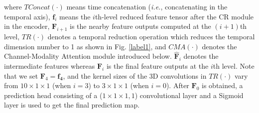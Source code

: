 \documentclass[letterpaper]{article}
\def\ie{\emph{i.e.}}
\begin{document}
\noindent where $TConcat(\cdot)$ means time concatenation (\ie, concatenating in the temporal axis), $\mathbf{f}_{i}$ means the $i$th-level reduced feature tensor after the CR module in the encoder, $\mathbf{F}_{i+1}$ is the nearby feature outputs computed at the $(i+1)$th level, $TR(\cdot)$ denotes a temporal reduction operation which reduces the temporal dimension number to 1 as shown in Fig. \ref{label1}, and $CMA(\cdot)$ denotes the Channel-Modality Attention module introduced below. $\mathbf{\hat F}_{i}$ denotes the intermediate features whereas $\mathbf{F}_{i}$ is the final feature outputs at the $i$th level. Note that we set $\mathbf{F}_{4}=\mathbf{f_{4}}$, and the kernel sizes of the 3D convolutions in $TR(\cdot)$ vary from $10\times 1 \times 1$ (when $i=3$) to $3\times 1 \times 1$ (when $i=0$). After $\mathbf{F}_{0}$ is obtained, a prediction head consisting of a ($1\times 1\times 1,1$) convolutional layer and a Sigmoid layer is used to get the final prediction map.
\end{document}
